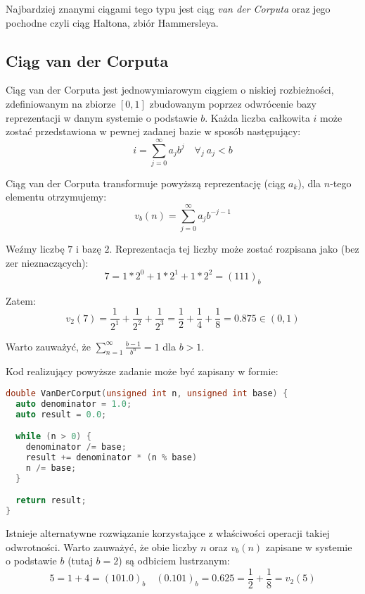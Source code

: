 \documentclass[../main.tex]{subfiles}
\begin{document}
Najbardziej znanymi ciągami tego typu jest ciąg \textit{van der Corputa} oraz jego pochodne czyli ciąg Haltona, zbiór Hammersleya.

\subsection{Ciąg van der Corputa}

Ciąg van der Corputa \cite{WongSamplingWH} jest jednowymiarowym ciągiem o niskiej rozbieżności, zdefiniowanym na zbiorze $[0,1]$ zbudowanym poprzez odwrócenie bazy reprezentacji w danym systemie o podstawie $b$. Każda liczba całkowita $i$ może zostać przedstawiona w pewnej zadanej bazie w sposób następujący:
\[ 
i = \sum_{j=0}^{\infty} {a_j b^j} \quad \forall_{j}\: a_j < b
\]

Ciąg van der Corputa transformuje powyższą reprezentację (ciąg $a_k$), dla $n$-tego elementu otrzymujemy:
\[ 
v_b(n) = \sum_{j=0}^{\infty} {a_j b^{-j-1}} 
\]

\begin{example}
  Weźmy liczbę $7$ i bazę $2$. Reprezentacja tej liczby może zostać rozpisana jako (bez zer nieznaczących):
  \[ 
  7 = 1 * 2^0 + 1 * 2^1 + 1 * 2^2 = (111)_{b} 
  \]

  \noindent Zatem:
  \[
    v_{2}(7)
      = \frac{1}{2^{1}} + \frac{1}{2^{2}} + \frac{1}{2^{3}}
      = \frac{1}{2} + \frac{1}{4} + \frac{1}{8}
      = 0.875
      \in (0,1)
  \]
\end{example}

Warto zauważyć, że $\sum_{n=1}^{\infty} \frac{b-1}{b^n} = 1$ dla $b>1$.

Kod realizujący powyższe zadanie może być zapisany w formie:

\begin{lstlisting}[language=c++]
double VanDerCorput(unsigned int n, unsigned int base) {
  auto denominator = 1.0;
  auto result = 0.0;

  while (n > 0) {
    denominator /= base;
    result += denominator * (n % base)
    n /= base;
  }

  return result;
}
\end{lstlisting}

Istnieje alternatywne rozwiązanie korzystające z właściwości operacji takiej odwrotności. Warto zauważyć, że obie liczby $n$ oraz $v_b(n)$ zapisane w systemie o podstawie $b$ (tutaj $b=2$) są odbiciem lustrzanym:
\[
  5 = 1 + 4 = (101.0)_{b} \quad
  (0.101)_{b} = 0.625 = \frac{1}{2} + \frac{1}{8} = v_2(5)
\]
\end{document}

